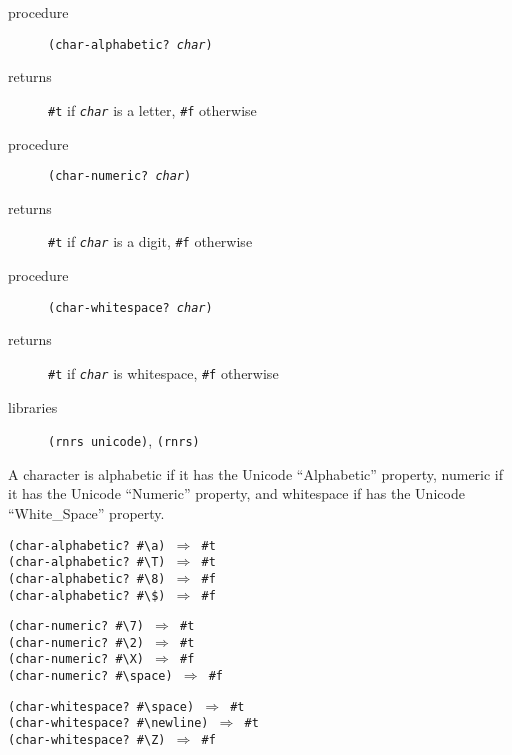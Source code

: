 \begin{description}

\label{objects_s203}\item[procedure] \texttt{(char-alphabetic? \textit{char})}



\item[returns] \texttt{\#{}t} if \texttt{\textit{char}} is a letter, \texttt{\#{}f} otherwise


\item[procedure] \texttt{(char-numeric? \textit{char})}



\item[returns] \texttt{\#{}t} if \texttt{\textit{char}} is a digit, \texttt{\#{}f} otherwise


\item[procedure] \texttt{(char-whitespace? \textit{char})}



\item[returns] \texttt{\#{}t} if \texttt{\textit{char}} is whitespace, \texttt{\#{}f} otherwise


\item[libraries] \texttt{(rnrs unicode)}, \texttt{(rnrs)}
\end{description}


A character is alphabetic if it has the Unicode ``Alphabetic'' property,
numeric if it has the Unicode ``Numeric'' property, and whitespace if has
the Unicode ``White\_{}Space'' property.


\begin{alltt}
(char-alphabetic? \#{}\textbackslash{}a) \(\Rightarrow\) \#{}t
(char-alphabetic? \#{}\textbackslash{}T) \(\Rightarrow\) \#{}t
(char-alphabetic? \#{}\textbackslash{}8) \(\Rightarrow\) \#{}f
(char-alphabetic? \#{}\textbackslash{}\${}) \(\Rightarrow\) \#{}f

(char-numeric? \#{}\textbackslash{}7) \(\Rightarrow\) \#{}t
(char-numeric? \#{}\textbackslash{}2) \(\Rightarrow\) \#{}t
(char-numeric? \#{}\textbackslash{}X) \(\Rightarrow\) \#{}f
(char-numeric? \#{}\textbackslash{}space) \(\Rightarrow\) \#{}f

(char-whitespace? \#{}\textbackslash{}space) \(\Rightarrow\) \#{}t
(char-whitespace? \#{}\textbackslash{}newline) \(\Rightarrow\) \#{}t
(char-whitespace? \#{}\textbackslash{}Z) \(\Rightarrow\) \#{}f
\end{alltt}

